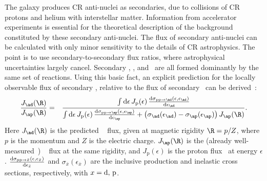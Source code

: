 The galaxy produces CR anti-nuclei as secondaries, due to collisions of CR protons and helium with interstellar matter. Information from accelerator experiments is essential for the theoretical description of the background constituted by these secondary anti-nuclei.
The flux of secondary anti-nuclei can be calculated with only minor sensitivity to the details of CR astrophysics. The point is to use secondary-to-secondary flux ratios, where astrophysical uncertainties largely cancel. 
%
Secondary \antip, \antid, and \antihethree~are all formed dominantly by the same set of reactions. 
%
Using this basic fact, an explicit prediction for the locally observable flux of secondary \antid, relative to the flux of secondary \antip~can be derived~\cite{Ginzburg:1990sk,Katz:2009yd,Blum:2017qnn}:
%
\begin{eqnarray}
\label{eq:ad2ap}\frac{J_{\ad}(\R)}{J_{\ap}(\R)}&=&\frac{\int \rmd\epsilon\,J_{\mathrm{p}}(\epsilon)\,\frac{\rmd\sigma_{\mathrm{pp}\to\ad}(\epsilon,\epsilon_{\ad})}{\rmd\epsilon_{\ad}}}{\int \rmd\epsilon\,J_{\mathrm{p}}(\epsilon)\,\frac{\rmd\sigma_{\mathrm{pp}\to\ap}(\epsilon,\epsilon_{\ap})}{\rmd\epsilon_{\ap}}+\left(\sigma_{\ad}(\epsilon_{\ad})-\sigma_{\ap}(\epsilon_{\ap})\right)J_{\ap}(\R)}.
\end{eqnarray}
%
%
\noindent %
Here $J_{\ad}(\R)$ is the predicted \antid~ flux, given at magnetic rigidity $\R = p/Z$, where $p$ is the momentum and $Z$ is the electric charge. $J_{\ap}(\R)$ is the (already well-measured~\cite{Aguilar:2016kjl}) \antip~ flux at the same rigidity, and  
%
$J_{\mathrm{p}}(\epsilon)$ is the proton flux~\cite{Aguilar:2015ooa} at energy $\epsilon$. 
%
$\frac{\mathrm{d}\sigma_{\mathrm{pp}\to\bar x}(\epsilon,\epsilon_{\bar x})}{\mathrm{d}\epsilon_{\bar x}}$ and $\sigma_{\bar x}(\epsilon_{\bar x})$ are the inclusive production and inelastic cross sections, respectively, with $x={\rm d},\,{\rm p}$. 
